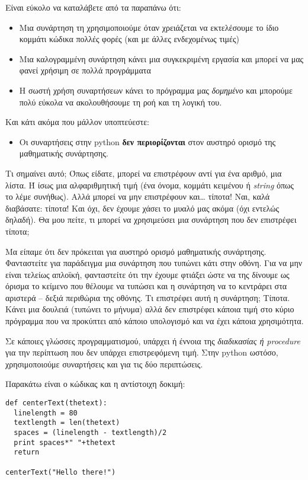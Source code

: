 Είναι εύκολο να καταλάβετε από τα παραπάνω ότι:
%
\begin{itemize}
  \item Μια συνάρτηση τη χρησιμοποιούμε όταν χρειάζεται να εκτελέσουμε
      το ίδιο κομμάτι κώδικα πολλές φορές (και με άλλες ενδεχομένως
      τιμές)
  \item Μια καλογραμμένη συνάρτηση κάνει μια συγκεκριμένη εργασία και
      μπορεί να μας φανεί χρήσιμη σε πολλά προγράμματα
  \item Η σωστή χρήση συναρτήσεων κάνει το πρόγραμμα μας
      {\em δομημένο} και μπορούμε πολύ εύκολα να ακολουθήσουμε
      τη ροή και τη λογική του.
\end{itemize}
%
Και κάτι ακόμα που μάλλον υποπτεύεστε:
%
\begin{itemize}
  \item Οι συναρτήσεις στην python {\bf δεν περιορίζονται} στον αυστηρό ορισμό
      της μαθηματικής συνάρτησης.
\end{itemize}
%
Τι σημαίνει αυτό; Όπως είδατε, μπορεί να επιστρέφουν αντί για ένα
αριθμό, μια λίστα. Ή ίσως μια αλφαριθμητική τιμή (ένα όνομα, κομμάτι
κειμένου ή {\em string} όπως το λέμε συνήθως).  Αλλά μπορεί να μην
επιστρέφουν και\ldots{} τίποτα! Ναι, καλά διαβάσατε: τίποτα! Και όχι, δεν
έχουμε χάσει το μυαλό μας ακόμα (όχι εντελώς δηλαδή).  Θα μου πείτε, τι
μπορεί να χρησιμεύσει μια συνάρτηση που δεν επιστρέφει τίποτα;

Μα είπαμε ότι δεν πρόκειται για αυστηρό ορισμό μαθηματικής συνάρτησης.
Φανταστείτε για παράδειγμα μια συνάρτηση που τυπώνει κάτι στην οθόνη.
Για να μην είναι τελείως απλοϊκή, φανταστείτε ότι την έχουμε φτιάξει
ώστε να της δίνουμε ως όρισμα το κείμενο που θέλουμε να τυπώσει και
η συνάρτηση να το κεντράρει στα αριστερά -- δεξιά περιθώρια της οθόνης.
Τι επιστρέφει αυτή η συνάρτηση; Τίποτα. Κάνει μια δουλειά (τυπώνει το
μήνυμα) αλλά δεν επιστρέφει κάποια τιμή στο κύριο πρόγραμμα που να
προκύπτει από κάποιο υπολογισμό και να έχει κάποια χρησιμότητα.

Σε κάποιες γλώσσες προγραμματισμού, υπάρχει ή έννοια της {\em διαδικασίας
ή procedure} για την περίπτωση που δεν υπάρχει
επιστρεφόμενη τιμή.  Στην python ωστόσο, χρησιμοποιούμε συναρτήσεις
και για τις δύο περιπτώσεις.

Παρακάτω είναι ο κώδικας και η αντίστοιχη δοκιμή:

\begin{verbatim}
def centerText(thetext):
  linelength = 80
  textlength = len(thetext)
  spaces = (linelength - textlength)/2
  print spaces*" "+thetext
  return

centerText("Hello there!")
\end{verbatim}

